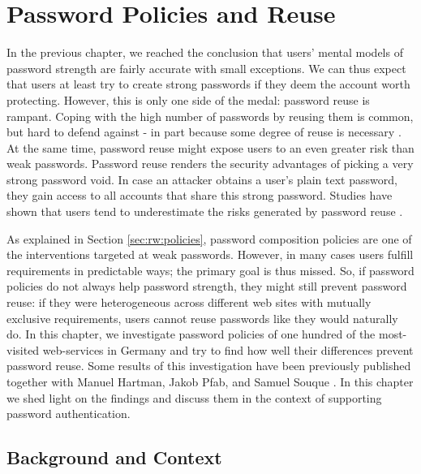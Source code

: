 \chapter[Password Policies and Reuse]{Password Policies and Reuse}\label{chap:policies_reuse}
In the previous chapter, we reached the conclusion that users' mental models of password strength are fairly accurate with small exceptions. We can thus expect that users at least try to create strong passwords if they deem the account worth protecting. 
However, this is only one side of the medal: password reuse is rampant. Coping with the high number of passwords by reusing them is common, but hard to defend against - in part because some degree of reuse is necessary \cite{Florencio2014PasswordPortfoliosFiniteUser, ZhangKennedy2016RevisitingPasswordRules}.  At the same time, password reuse might expose users to an even greater risk than weak passwords. Password reuse renders the security advantages of picking a very strong password void. In case an attacker obtains a user's plain text password, they gain access to all accounts that share this strong password. Studies have shown that users tend to underestimate the risks generated by password reuse \ar.

As explained in Section \ref{sec:rw:policies}, password composition policies are one of the interventions targeted at weak passwords. However, in many cases users fulfill requirements in predictable ways; the primary goal is thus missed. So, if password policies do not always help password strength, they might still prevent password reuse: if they were heterogeneous across different web sites with mutually exclusive requirements, users cannot reuse passwords like they would naturally do. In this chapter, we investigate password policies of one hundred of the most-visited web-services in Germany and try to find how well their differences prevent password reuse. Some results of this investigation have been previously published together with Manuel Hartman, Jakob Pfab, and Samuel Souque \cite{Seitz2017PoliciesReuse}. In this chapter we shed light on the findings and discuss them in the context of supporting password authentication. 

\section{Background and Context}

